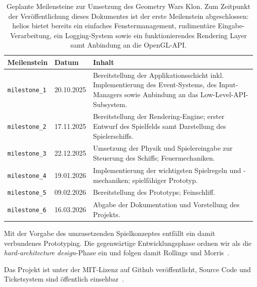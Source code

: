 \setlength{\tabcolsep}{8pt}
\begin{table}[t]
    \centering
    {\renewcommand{\arraystretch}{1.2}%
    \begin{tabularx}{\textwidth}{@{} l l Y @{}}
        \toprule
        \textbf{Meilenstein} & \textbf{Datum} & \textbf{Inhalt} \\
        \midrule
        \texttt{milestone\_1} & 20.10.2025 &
        Bereitstellung der Applikationsschicht inkl. Implementierung des Event-Systems,
        des Input-Managers sowie Anbindung an das Low-Level-API-Subsystem. \\
        \texttt{milestone\_2} & 17.11.2025 &
        Bereitstellung der Rendering-Engine; erster Entwurf des Spielfelds samt Darstellung des Spielerschiffs. \\
        \texttt{milestone\_3} & 22.12.2025 &
        Umsetzung der Physik und Spielereingabe zur Steuerung des Schiffs; Feuermechaniken. \\
        \texttt{milestone\_4} & 19.01.2026 &
        Implementierung der wichtigsten Spielregeln und -mechaniken; spielfähiger Prototyp. \\
        \texttt{milestone\_5} & 09.02.2026 &
        Bereitstellung des Prototyps; Feinschliff. \\
        \texttt{milestone\_6} & 16.03.2026 &
        Abgabe der Dokumentation und Vorstellung des Projekts. \\
        \bottomrule
    \end{tabularx}}
    \caption{Geplante Meilensteine zur Umsetzung des Geometry Wars Klon.
    Zum Zeitpunkt der Veröffentlichung dieses Dokumentes ist der erste Meilenstein abgeschlossen: helios bietet bereits ein einfaches Fenstermanagement, rudimentäre Eingabe-Verarbeitung, ein Logging-System sowie ein funktionierendes Rendering Layer samt Anbindung an die OpenGL-API.}
    \label{tab:zeitplan}
\end{table}



\noindent
Mit der Vorgabe des umzusetzenden Spielkonzeptes entfällt ein damit verbundenes Prototyping.
Die gegenwärtige Entwicklungsphase ordnen wir als die \textit{hard-architecture design}-Phase ein und folgen damit Rollings und Morris~\cite[628]{RM04}.\par

Das Projekt ist unter der MIT-Lizenz  auf Github veröffentlicht, Source Code und Ticketsystem sind öffentlich einsehbar~\cite[]{heliosgithub}.\par


